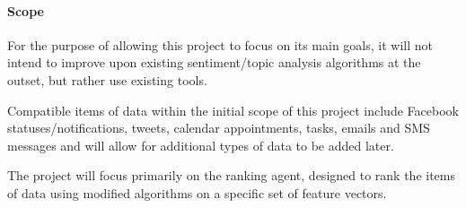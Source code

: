 \documentclass[12pt]{article}
\begin{document}
\paragraph{Scope}
For the purpose of allowing this project to focus on its main goals, it will not intend to improve upon existing sentiment/topic analysis algorithms at the outset, but rather use existing tools. 

Compatible items of data within the initial scope of this project include Facebook statuses/notifications, tweets, calendar appointments, tasks, emails and SMS messages and will allow for additional types of data to be added later.

The project will focus primarily on the ranking agent, designed to rank the items of data using modified algorithms on a specific set of feature vectors.
\end{document}
